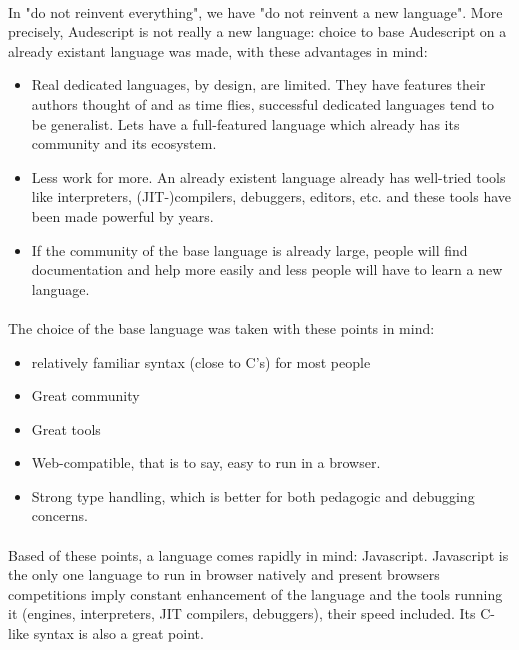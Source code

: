 \documentclass{article}
\begin{document}
\begin{sloppypar}
\paragraph{}
In "do not reinvent everything", we have "do not reinvent a new language". More precisely, Audescript is not really a new language: choice to base Audescript on a already existant language was made, with these advantages in mind:
    
\begin{itemize}
	\item{ Real dedicated languages, by design, are limited. They have features their authors thought of and as time flies, successful dedicated languages tend to be generalist. Lets have a full-featured language which already has its community and its ecosystem.}
	\item{ Less work for more. An already existent language already has well-tried tools like interpreters, (JIT-)compilers, debuggers, editors, etc. and these tools have been made powerful by years.}
	\item{ If the community of the base language is already large, people will find documentation and help more easily and less people will have to learn a new language.}
\end{itemize}

\paragraph{}
The choice of the base language was taken with these points in mind:
    
\begin{itemize}
	\item{ relatively familiar syntax (close to C's) for most people}
	\item{ Great community}
	\item{ Great tools}
	\item{ Web-compatible, that is to say, easy to run in a browser.}
	\item{ Strong type handling, which is better for both pedagogic and debugging concerns.}
\end{itemize}

\paragraph{}
Based of these points, a language comes rapidly in mind: Javascript. Javascript is the only one language to run in browser natively and present browsers competitions imply constant enhancement of the language and the tools running it (engines, interpreters, JIT compilers, debuggers), their speed included. Its C-like syntax is also a great point.


\end{sloppypar}
\end{document}
